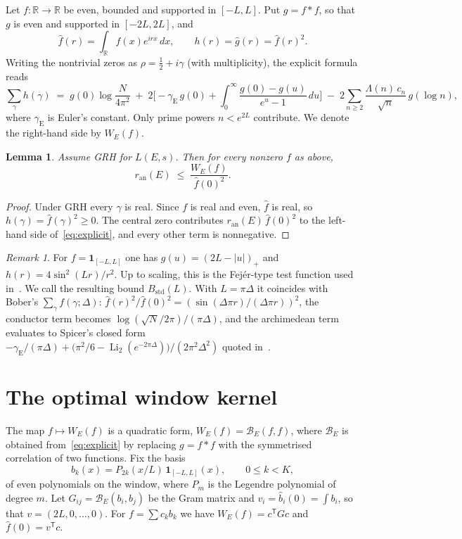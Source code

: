 \documentclass[11pt]{amsart}
\newtheorem{lemma}[theorem]{Lemma}
\theoremstyle{remark}
\newtheorem{remark}[theorem]{Remark}
\theoremstyle{definition}
\newcommand{\R}{\mathbb{R}}
\newcommand{\ran}{r_{\mathrm{an}}}
\begin{document}
Let $f\colon\R\to\R$ be even, bounded and supported in $[-L,L]$. Put $g=f*f$, so that $g$ is even and supported in $[-2L,2L]$, and
\[
\hat f(r)=\int_{\R} f(x)e^{irx}\,dx,\qquad h(r)=\hat g(r)=\hat f(r)^2 .
\]
Writing the nontrivial zeros as $\rho=\tfrac12+i\gamma$ (with multiplicity), the explicit formula reads
\begin{equation}\label{eq:explicit}
\sum_{\gamma} h(\gamma) \;=\; g(0)\log\frac{N}{4\pi^2}
\;+\;2\Big[-\gamma_{\mathrm E}\,g(0)+\int_0^{\infty}\frac{g(0)-g(u)}{e^{u}-1}\,du\Big]
\;-\;2\sum_{n\ge 2}\frac{\Lambda(n)\,c_n}{\sqrt n}\,g(\log n),
\end{equation}
where $\gamma_{\mathrm E}$ is Euler's constant. Only prime powers $n<e^{2L}$ contribute. We denote the right-hand side by $W_E(f)$.

\begin{lemma}\label{lem:bound}
Assume GRH for $L(E,s)$. Then for every nonzero $f$ as above,
\[
\ran(E)\;\le\;\frac{W_E(f)}{\hat f(0)^2}.
\]
\end{lemma}
\begin{proof}
Under GRH every $\gamma$ is real. Since $f$ is real and even, $\hat f$ is real, so $h(\gamma)=\hat f(\gamma)^2\ge0$. The central zero contributes $\ran(E)\,\hat f(0)^2$ to the left-hand side of~\eqref{eq:explicit}, and every other term is nonnegative.
\end{proof}

\begin{remark}
For $f=\mathbf 1_{[-L,L]}$ one has $g(u)=(2L-|u|)_+$ and $h(r)=4\sin^2(Lr)/r^2$. Up to scaling, this is the Fej\'er-type test function used in~\cite{Bober,KSW}. We call the resulting bound $B_{\mathrm{std}}(L)$. With $L=\pi\Delta$ it coincides with Bober's $\sum_\gamma f(\gamma;\Delta)$: $\hat f(r)^2/\hat f(0)^2=(\sin(\Delta\pi r)/(\Delta\pi r))^2$, the conductor term becomes $\log(\sqrt N/2\pi)/(\pi\Delta)$, and the archimedean term evaluates to Spicer's closed form $-\gamma_{\mathrm E}/(\pi\Delta)+\big(\pi^2/6-\operatorname{Li}_2(e^{-2\pi\Delta})\big)/(2\pi^2\Delta^2)$ quoted in~\cite{KSW}.
\end{remark}

\section{The optimal window kernel}

The map $f\mapsto W_E(f)$ is a quadratic form, $W_E(f)=\mathcal B_E(f,f)$, where $\mathcal B_E$ is obtained from~\eqref{eq:explicit} by replacing $g=f*f$ with the symmetrised correlation of two functions. Fix the basis
\[
b_k(x)=P_{2k}(x/L)\,\mathbf 1_{[-L,L]}(x),\qquad 0\le k<K,
\]
of even polynomials on the window, where $P_m$ is the Legendre polynomial of degree $m$. Let $G_{ij}=\mathcal B_E(b_i,b_j)$ be the Gram matrix and $v_i=\hat b_i(0)=\int b_i$, so that $v=(2L,0,\dots,0)$. For $f=\sum c_k b_k$ we have $W_E(f)=c^{\mathsf T}Gc$ and $\hat f(0)=v^{\mathsf T}c$.
\end{document}
